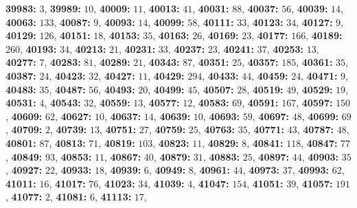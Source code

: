 \textsf{\bfseries 39983:} $3$, \textsf{\bfseries 39989:} $10$, \textsf{\bfseries 40009:} $11$, \textsf{\bfseries 40013:} $41$, \textsf{\bfseries 40031:} $88$, \textsf{\bfseries 40037:} $56$, \textsf{\bfseries 40039:} $14$, \textsf{\bfseries 40063:} $133$, \textsf{\bfseries 40087:} $9$, \textsf{\bfseries 40093:} $14$, \textsf{\bfseries 40099:} $58$, \textsf{\bfseries 40111:} $33$, \textsf{\bfseries 40123:} $34$, \textsf{\bfseries 40127:} $9$, \textsf{\bfseries 40129:} $126$, \textsf{\bfseries 40151:} $18$, \textsf{\bfseries 40153:} $35$, \textsf{\bfseries 40163:} $26$, \textsf{\bfseries 40169:} $23$, \textsf{\bfseries 40177:} $166$, \textsf{\bfseries 40189:} $260$, \textsf{\bfseries 40193:} $34$, \textsf{\bfseries 40213:} $21$, \textsf{\bfseries 40231:} $33$, \textsf{\bfseries 40237:} $23$, \textsf{\bfseries 40241:} $37$, \textsf{\bfseries 40253:} $13$, \textsf{\bfseries 40277:} $7$, \textsf{\bfseries 40283:} $81$, \textsf{\bfseries 40289:} $21$, \textsf{\bfseries 40343:} $87$, \textsf{\bfseries 40351:} $25$, \textsf{\bfseries 40357:} $185$, \textsf{\bfseries 40361:} $35$, \textsf{\bfseries 40387:} $24$, \textsf{\bfseries 40423:} $32$, \textsf{\bfseries 40427:} $11$, \textsf{\bfseries 40429:} $294$, \textsf{\bfseries 40433:} $44$, \textsf{\bfseries 40459:} $24$, \textsf{\bfseries 40471:} $9$, \textsf{\bfseries 40483:} $35$, \textsf{\bfseries 40487:} $56$, \textsf{\bfseries 40493:} $20$, \textsf{\bfseries 40499:} $45$, \textsf{\bfseries 40507:} $28$, \textsf{\bfseries 40519:} $49$, \textsf{\bfseries 40529:} $19$, \textsf{\bfseries 40531:} $4$, \textsf{\bfseries 40543:} $32$, \textsf{\bfseries 40559:} $13$, \textsf{\bfseries 40577:} $12$, \textsf{\bfseries 40583:} $69$, \textsf{\bfseries 40591:} $167$, \textsf{\bfseries 40597:} $150$, \textsf{\bfseries 40609:} $62$, \textsf{\bfseries 40627:} $10$, \textsf{\bfseries 40637:} $14$, \textsf{\bfseries 40639:} $10$, \textsf{\bfseries 40693:} $59$, \textsf{\bfseries 40697:} $48$, \textsf{\bfseries 40699:} $69$, \textsf{\bfseries 40709:} $2$, \textsf{\bfseries 40739:} $13$, \textsf{\bfseries 40751:} $27$, \textsf{\bfseries 40759:} $25$, \textsf{\bfseries 40763:} $35$, \textsf{\bfseries 40771:} $43$, \textsf{\bfseries 40787:} $48$, \textsf{\bfseries 40801:} $87$, \textsf{\bfseries 40813:} $71$, \textsf{\bfseries 40819:} $103$, \textsf{\bfseries 40823:} $11$, \textsf{\bfseries 40829:} $8$, \textsf{\bfseries 40841:} $118$, \textsf{\bfseries 40847:} $77$, \textsf{\bfseries 40849:} $93$, \textsf{\bfseries 40853:} $11$, \textsf{\bfseries 40867:} $40$, \textsf{\bfseries 40879:} $31$, \textsf{\bfseries 40883:} $25$, \textsf{\bfseries 40897:} $44$, \textsf{\bfseries 40903:} $35$, \textsf{\bfseries 40927:} $22$, \textsf{\bfseries 40933:} $18$, \textsf{\bfseries 40939:} $6$, \textsf{\bfseries 40949:} $8$, \textsf{\bfseries 40961:} $44$, \textsf{\bfseries 40973:} $37$, \textsf{\bfseries 40993:} $62$, \textsf{\bfseries 41011:} $16$, \textsf{\bfseries 41017:} $76$, \textsf{\bfseries 41023:} $34$, \textsf{\bfseries 41039:} $4$, \textsf{\bfseries 41047:} $154$, \textsf{\bfseries 41051:} $39$, \textsf{\bfseries 41057:} $191$, \textsf{\bfseries 41077:} $2$, \textsf{\bfseries 41081:} $6$, \textsf{\bfseries 41113:} $17$, 
